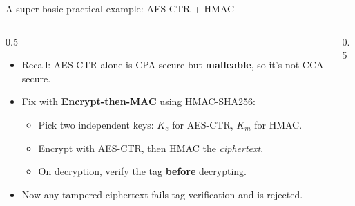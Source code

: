 \ifdefined\PRESENTATION\else\PassOptionsToClass{handout}{beamer}\fi\documentclass[aspectratio=169, lualatex]{beamer}
\begin{document}
\begin{frame}{A super basic practical example: AES-CTR + HMAC}
	\begin{columns}[c]
		\begin{column}{0.5\textwidth}
			\begin{itemize}
				\item Recall: AES-CTR alone is CPA-secure but \textbf{malleable}, so it's not CCA-secure.
				\item Fix with \textbf{Encrypt-then-MAC} using HMAC-SHA256:
				      \begin{itemize}
					      \item Pick two independent keys: $K_e$ for AES-CTR, $K_m$ for HMAC.
					      \item Encrypt with AES-CTR, then HMAC the \textit{ciphertext}.
					      \item On decryption, verify the tag \textbf{before} decrypting.
				      \end{itemize}
				\item Now any tampered ciphertext fails tag verification and is rejected.
			\end{itemize}
		\end{column}
		\begin{column}{0.5\textwidth}
		\end{column}
	\end{columns}
\end{frame}
\end{document}
